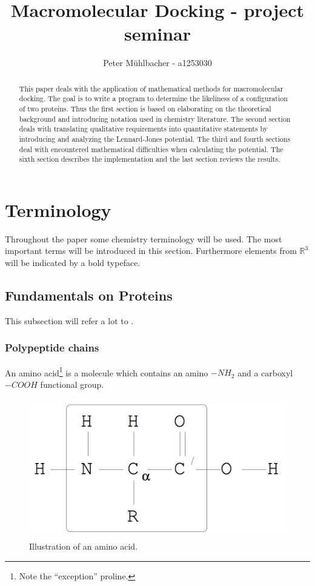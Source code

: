 \documentclass[12pt]{article}
\title{Macromolecular Docking - project seminar}
\author{Peter M\"uhlbacher - a1253030}
\theoremstyle{definition}\newtheorem*{definition}{Definition}
\theoremstyle{definition}\newtheorem*{remark}{Remark}
\begin{document}
\maketitle

\begin{abstract}
This paper deals with the application of mathematical methods for macromolecular docking. The goal is to write a program to determine the likeliness of a configuration of two proteins. Thus the first section is based on elaborating on the theoretical background and introducing notation used in chemistry literature. The second section deals with translating qualitative requirements into quantitative statements by introducing and analyzing the Lennard-Jones potential. The third and fourth sections deal with encountered mathematical difficulties when calculating the potential. The sixth section describes the implementation and the last section reviews the results.
\end{abstract}

\section{Terminology}
Throughout the paper some chemistry terminology will be used. The most important terms will be introduced in this section.
Furthermore elements from $\mathbb R^3$ will be indicated by a bold typeface.

\subsection{Fundamentals on Proteins}
This subsection will refer a lot to \cite{burger}.

\subsubsection{Polypeptide chains}
An amino acid\footnote{Note the ``exception'' proline.} is a molecule which contains an amino $-NH_2$ and a carboxyl $-COOH$ functional group.

\begin{figure}
\caption{Illustration of an amino acid. \cite{Neumaier97}}
\includegraphics[width=0.7\linewidth]{aminoacid.png}
\end{figure}
\end{document}
